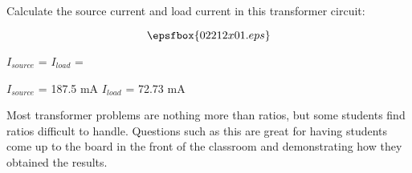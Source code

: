 

Calculate the source current and load current in this transformer circuit:

$$\epsfbox{02212x01.eps}$$

$I_{source}$ = \hskip 80pt $I_{load}$ =

\vskip 10pt







$I_{source}$ = 187.5 mA \hskip 80pt $I_{load}$ = 72.73 mA







Most transformer problems are nothing more than ratios, but some students find ratios difficult to handle.  Questions such as this are great for having students come up to the board in the front of the classroom and demonstrating how they obtained the results.




